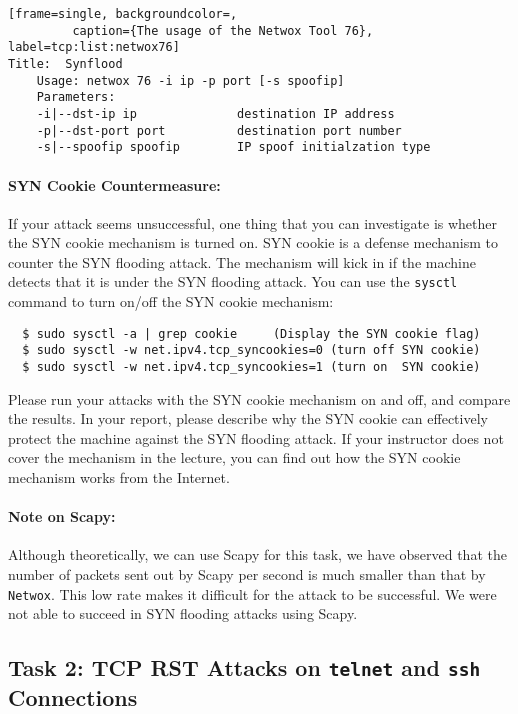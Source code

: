 \begin{lstlisting}[frame=single, backgroundcolor=,
         caption={The usage of the Netwox Tool 76}, label=tcp:list:netwox76]
Title:  Synflood    
    Usage: netwox 76 -i ip -p port [-s spoofip]
    Parameters:
    -i|--dst-ip ip              destination IP address 
    -p|--dst-port port          destination port number 
    -s|--spoofip spoofip        IP spoof initialzation type 
\end{lstlisting}

\paragraph{SYN Cookie Countermeasure:}
If your attack seems unsuccessful, one thing that you can investigate is whether 
the SYN cookie mechanism is turned on. SYN cookie is a defense mechanism to 
counter the SYN flooding attack.  The mechanism will kick in if the machine
detects that it is under the SYN flooding attack.
You can use the {\tt sysctl} command to turn on/off the SYN cookie mechanism:
\begin{verbatim}
  $ sudo sysctl -a | grep cookie     (Display the SYN cookie flag) 
  $ sudo sysctl -w net.ipv4.tcp_syncookies=0 (turn off SYN cookie)
  $ sudo sysctl -w net.ipv4.tcp_syncookies=1 (turn on  SYN cookie)
\end{verbatim}

Please run your attacks with the SYN cookie mechanism on and off,
and compare the results. In your report, please describe why 
the SYN cookie can effectively protect the machine against the 
SYN flooding attack. If your instructor does not cover the 
mechanism in the lecture, you can find out how the SYN cookie 
mechanism works from the Internet.



\paragraph{Note on Scapy:} Although theoretically, we can use Scapy for this task, we have
observed that the number of packets sent out by Scapy per second is much smaller than that by
\texttt{Netwox}. This low rate makes it difficult for the attack to be successful.   We were
not able to succeed in SYN flooding attacks using Scapy.



\subsection {Task 2: TCP RST Attacks on \texttt{telnet} and 
             \texttt{ssh} Connections}

